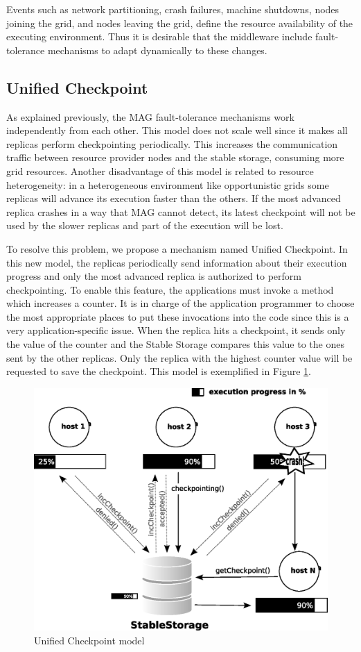 \documentclass[times, 09pt, twocolumn]{article}
\begin{document}
Events such as network partitioning, crash failures, machine shutdowns,
nodes joining the grid, and nodes leaving the grid, define the resource
availability of the executing environment. Thus it is desirable that the middleware 
include fault-tolerance mechanisms to adapt dynamically to these changes.

\subsection{Unified Checkpoint}

As explained previously, the MAG fault-tolerance mechanisms work
independently from each other. This model does not scale well since it
makes all replicas perform checkpointing periodically. 
This increases the communication traffic between resource provider nodes and
the stable storage, consuming more grid resources. 
Another disadvantage of this model is related to resource
heterogeneity: in a heterogeneous environment like opportunistic grids some
replicas will advance its execution faster than the others. If the most
advanced replica crashes in a way that MAG cannot detect, its latest checkpoint
will not be used by the slower replicas and part of the execution will be
lost. 

To resolve this problem, we propose a mechanism named Unified Checkpoint. In
this new model, the replicas periodically send information about their
execution progress and only the most advanced replica is authorized to perform
checkpointing. To enable this feature, the applications must invoke a method
which increases a counter. It is in charge of the application programmer to
choose the most appropriate places to put these invocations into the code
since this is a very application-specific issue. When the replica hits a
checkpoint, it sends only the value of the counter and the Stable Storage
compares this value to the ones sent by the other replicas. Only the
replica with the highest counter value will be requested to save the
checkpoint. This model is exemplified in Figure \ref{fig:repCheckNovo}.

\begin{figure}[th]
\centering \includegraphics[width=0.9\columnwidth]{repCheckNovoFalha.eps}
\caption{Unified Checkpoint model}
\label{fig:repCheckNovo}
\end{figure}
\end{document}
